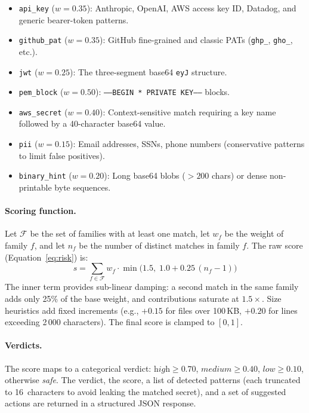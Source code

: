 \documentclass[11pt,twocolumn]{article}
\begin{document}
\begin{itemize}[nosep]
  \item \texttt{api\_key} ($w = 0.35$): Anthropic, OpenAI, AWS access key ID, Datadog, and generic bearer-token patterns.
  \item \texttt{github\_pat} ($w = 0.35$): GitHub fine-grained and classic PATs (\texttt{ghp\_}, \texttt{gho\_}, etc.).
  \item \texttt{jwt} ($w = 0.25$): The three-segment base64 \texttt{eyJ} structure.
  \item \texttt{pem\_block} ($w = 0.50$): \texttt{-----BEGIN * PRIVATE KEY-----} blocks.
  \item \texttt{aws\_secret} ($w = 0.40$): Context-sensitive match requiring a key name followed by a 40-character base64 value.
  \item \texttt{pii} ($w = 0.15$): Email addresses, SSNs, phone numbers (conservative patterns to limit false positives).
  \item \texttt{binary\_hint} ($w = 0.20$): Long base64 blobs ($>200$ chars) or dense non-printable byte sequences.
\end{itemize}

\paragraph{Scoring function.}
Let $\mathcal{F}$ be the set of families with at least one match, let
$w_f$ be the weight of family $f$, and let $n_f$ be the number of
distinct matches in family $f$.  The raw score
(Equation~\ref{eq:risk}) is:
\begin{equation}
  s = \sum_{f \in \mathcal{F}} w_f \cdot \min\!\bigl(1.5,\; 1.0 + 0.25\,(n_f - 1)\bigr)
  \label{eq:risk}
\end{equation}
The inner term provides sub-linear damping: a second match in the same
family adds only 25\% of the base weight, and contributions saturate at
$1.5\times$.  Size heuristics add fixed increments (e.g.,
$+0.15$ for files over 100\,KB, $+0.20$ for lines exceeding 2\,000
characters).  The final score is clamped to $[0, 1]$.

\paragraph{Verdicts.}
The score maps to a categorical verdict:
$\textit{high} \geq 0.70$,
$\textit{medium} \geq 0.40$,
$\textit{low} \geq 0.10$,
otherwise \textit{safe}.
The verdict, the score, a list of detected patterns (each truncated to
16~characters to avoid leaking the matched secret), and a set of
suggested actions are returned in a structured JSON response.
\end{document}
